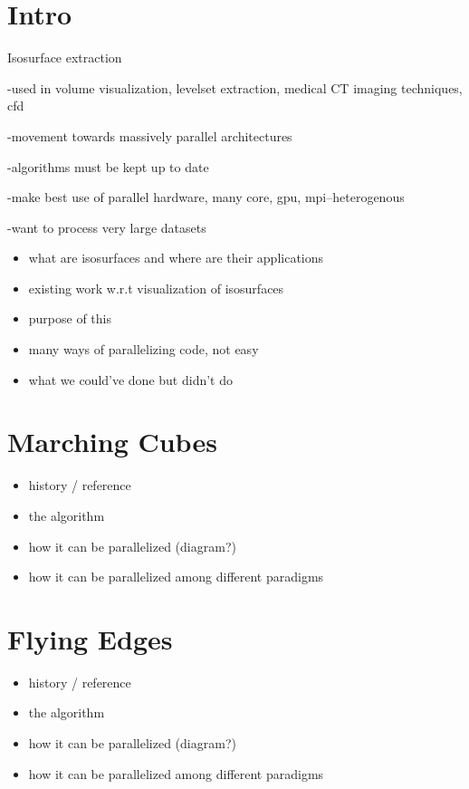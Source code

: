 \documentclass[letterpaper]{article}
\begin{document}
\section{Intro}

Isosurface extraction

-used in volume visualization, levelset extraction, medical CT imaging techniques, cfd

-movement towards massively parallel architectures

-algorithms must be kept up to date

-make best use of parallel hardware, many core, gpu, mpi--heterogenous

-want to process very large datasets

\begin{itemize}
    \item what are isosurfaces and where are their applications
    \item existing work w.r.t visualization of isosurfaces
    \item purpose of this
    \item many ways of parallelizing code, not easy
    \item what we could've done but didn't do
\end{itemize}

\section{Marching Cubes}
\begin{itemize}
    \item history / reference
    \item the algorithm
    \item how it can be parallelized (diagram?)
    \item how it can be parallelized among different paradigms
\end{itemize}

\section{Flying Edges}
\begin{itemize}
    \item history / reference
    \item the algorithm
    \item how it can be parallelized (diagram?)
    \item how it can be parallelized among different paradigms
\end{itemize}
\end{document}
